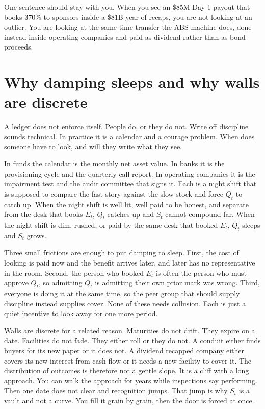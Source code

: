One sentence should stay with you. When you see an \$85M Day-1 payout that books 370\% to sponsors inside a \$81B year of recaps, you are not looking at an outlier. You are looking at the same time transfer the ABS machine does, done instead inside operating companies and paid as dividend rather than as bond proceeds.

\section{Why damping sleeps and why walls are discrete}

A ledger does not enforce itself. People do, or they do not. Write off discipline sounds technical. In practice it is a calendar and a courage problem. When does someone have to look, and will they write what they see.

In funds the calendar is the monthly net asset value. In banks it is the provisioning cycle and the quarterly call report. In operating companies it is the impairment test and the audit committee that signs it. Each is a night shift that is supposed to compare the fast story against the slow stock and force $Q_t$ to catch up. When the night shift is well lit, well paid to be honest, and separate from the desk that books $E_t$, $Q_t$ catches up and $S_t$ cannot compound far. When the night shift is dim, rushed, or paid by the same desk that booked $E_t$, $Q_t$ sleeps and $S_t$ grows.

Three small frictions are enough to put damping to sleep. First, the cost of looking is paid now and the benefit arrives later, and later has no representative in the room. Second, the person who booked $E_t$ is often the person who must approve $Q_t$, so admitting $Q_t$ is admitting their own prior mark was wrong. Third, everyone is doing it at the same time, so the peer group that should supply discipline instead supplies cover. None of these needs collusion. Each is just a quiet incentive to look away for one more period.

Walls are discrete for a related reason. Maturities do not drift. They expire on a date. Facilities do not fade. They either roll or they do not. A conduit either finds buyers for its new paper or it does not. A dividend recapped company either covers its new interest from cash flow or it needs a new facility to cover it. The distribution of outcomes is therefore not a gentle slope. It is a cliff with a long approach. You can walk the approach for years while inspections say performing. Then one date does not clear and recognition jumps. That jump is why $S_t$ is a vault and not a curve. You fill it grain by grain, then the door is forced at once.

